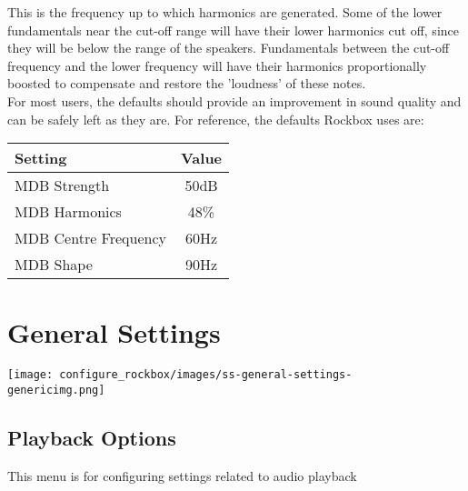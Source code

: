 \begin{itemize}
{\begin{itemize}
      This is the frequency up to which harmonics are generated.  Some of the lower fundamentals near the cut{}-off range will have their lower harmonics cut off, since they will be below the range of the speakers. Fundamentals between the cut{}-off frequency and the lower frequency will have their harmonics proportionally boosted to compensate and restore the 'loudness' of these notes.\\
      
      For most users, the defaults should provide an improvement in sound quality and can be safely left as they are.  For reference, the defaults Rockbox uses are:

      \begin{table}[h!]
        \begin{center}
          \begin{tabular}{@{}lc@{}}\toprule
            Setting & Value \\\midrule
            MDB Strength & 50dB \\
            MDB Harmonics & 48\% \\
            MDB Centre Frequency & 60Hz \\
            MDB Shape & 90Hz \\\bottomrule
          \end{tabular}
        \end{center}
      \end{table}
      
    \end{itemize}
  }
\end{itemize}


\section{\label{ref:GeneralSettings}General Settings}
\begin{center}
  \texttt{[image: configure\_rockbox/images/ss-general-settings-\\genericimg.png]}
\end{center}

\subsection{\label{ref:PlaybackOptions}Playback Options}
This menu is for configuring settings related to audio playback

